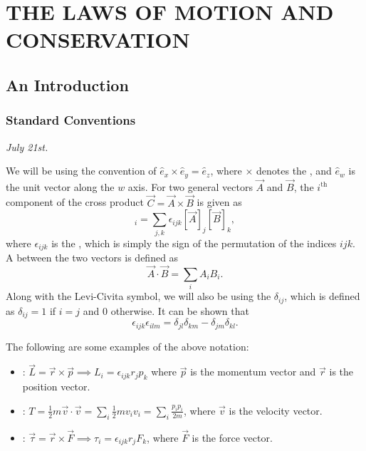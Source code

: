 \chapter{THE LAWS OF MOTION AND CONSERVATION}


\section{An Introduction}
\subsection{Standard Conventions}
\textit{July 21st.}

We will be using the convention of $\hat{e}_{x} \times \hat{e}_{y} = \hat{e}_{z}$, where $\times$ denotes the , and $\hat{e}_{w}$ is the unit vector along the $w$ axis. For two general vectors $\vec{A}$ and $\vec{B}$, the $i^{\text{th}}$ component of the cross product $\vec{C} = \vec{A} \times \vec{B}$ is given as
\begin{equation}
    [\vec{C}]_{i} = \sum_{j,k} \epsilon_{ijk} [\vec{A}]_{j} [\vec{B}]_{k},
\end{equation}
where $\epsilon_{ijk}$ is the , which is simply the sign of the permutation of the indices $ijk$. A  between the two vectors is defined as
\begin{equation}
    \vec{A} \cdot \vec{B} = \sum_{i} A_{i}B_{i}.
\end{equation}
Along with the Levi-Civita symbol, we will also be using the  $\delta_{ij}$, which is defined as $\delta_{ij} = 1$ if $i = j$ and $0$ otherwise. It can be shown that
\begin{equation}
    \epsilon_{ijk}\epsilon_{ilm} = \delta_{jl}\delta_{km} - \delta_{jm} \delta_{kl}.
\end{equation}

\begin{example}
    The following are some examples of the above notation:
    \begin{itemize}
        \item {}: $\vec{L} = \vec{r} \times \vec{p} \implies L_{i} = \epsilon_{ijk} r_{j}p_{k}$ where $\vec{p}$ is the momentum vector and $\vec{r}$ is the position vector.
        \item {}: $T = \frac{1}{2} m \vec{v} \cdot \vec{v} = \sum_{i} \frac{1}{2} m v_{i}v_{i} = \sum_{i} \frac{p_{i}p_{i}}{2m}$, where $\vec{v}$ is the velocity vector.
        \item {}: $\vec{\tau} = \vec{r} \times \vec{F} \implies \tau_{i} = \epsilon_{ijk} r_{j}F_{k}$, where $\vec{F}$ is the force vector.
    \end{itemize}
\end{example}

